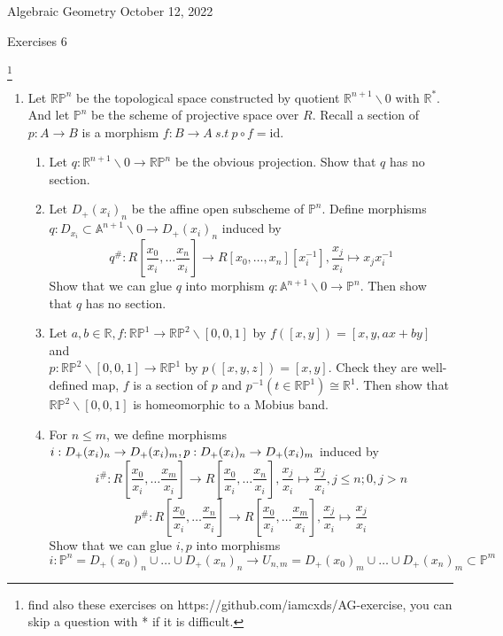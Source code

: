 \documentclass[a4paper,11pt]{article}
\def\bb#1{\mathbb{#1}}
\def\mrm#1{\mathrm{#1}}
\begin{document}
{\small Algebraic Geometry \hfill October 12, 2022 \\}
\begin{center}
\Huge Exercises 6
\end{center}

\vskip0.6cm
\footnote{find also these exercises on https://github.com/iamcxds/AG-exercise, you can skip a question with * if it is difficult.}

\begin{enumerate}[1.]
\item Let $\bb{R}\bb{P}^n$ be the topological space constructed by quotient $\bb{R}^{n+1}\backslash 0$ with $\bb{R}^*$. And let $\bb{P}^n$ be the scheme of projective space over $R$. Recall a section of $p:A\to B$ is a morphism $f:B\to A \ s.t \ p\circ f =\mrm{id}$.
\begin{enumerate}
    \item Let $q:\bb{R}^{n+1}\backslash 0 \to \bb{R}\bb{P}^n$ be the obvious projection. Show that $q$ has no section.
    \item Let $D_+(x_i)_n$ be the affine open subscheme of $\bb{P}^n$. Define  morphisms $q: D_{x_i}\subset \bb{A}^{n+1}\backslash 0 \to D_+(x_i)_n$ induced by 
    \[ q^\#: R[\frac{x_0}{x_i},\ldots \frac{x_n}{x_i}]\to R[x_0,\ldots,x_n][x_i^{-1}],  \frac{x_j}{x_i} \mapsto x_jx_i^{-1}\]
    Show that we can glue $q$ into morphism $q: \bb{A}^{n+1}\backslash 0 \to \bb{P}^n$. Then show that $q$ has no section.
    \item Let $a,b \in \bb{R}, f:\bb{R}\bb{P}^1\to \bb{R}\bb{P}^2\backslash[0,0,1] $ by $f([x,y])=[x,y,ax+by]$ and
    \\ $p:\bb{R}\bb{P}^2\backslash[0,0,1]\to\bb{R}\bb{P}^1$ by $p([x,y,z])=[x,y]$. Check they are well-defined map, $f$ is a section of $p$ and $p^{-1}(t\in \bb{R}\bb{P}^1)\cong \bb{R}^1$. 
    Then show that $\bb{R}\bb{P}^2\backslash[0,0,1]$ is homeomorphic to a Mobius band.
    \item  For $n\leq m$, we define morphisms $i: D_+(x_i)_n\to D_+(x_i)_m, \\p:D_+(x_i)_n\to D_+(x_i)_m$ induced by 
    \[i^\#:R[\frac{x_0}{x_i},\ldots \frac{x_m}{x_i}]\to R[\frac{x_0}{x_i},\ldots \frac{x_n}{x_i}],  \frac{x_j}{x_i} \mapsto \frac{x_j}{x_i}, j\leq n; 0 , j>n \]
    \[p^\#: R[\frac{x_0}{x_i},\ldots \frac{x_n}{x_i}]\to R[\frac{x_0}{x_i},\ldots \frac{x_m}{x_i}],  \frac{x_j}{x_i} \mapsto \frac{x_j}{x_i}\] 
    Show that we can glue $i, p$ into morphisms 
    \[i:\bb{P}^n= D_+(x_0)_n\cup \ldots \cup D_+(x_n)_n \to U_{n,m}= D_+(x_0)_m\cup \ldots  \cup D_+(x_n)_m \subset \bb{P}^m \]

\end{enumerate}
\end{enumerate}
\end{document}
